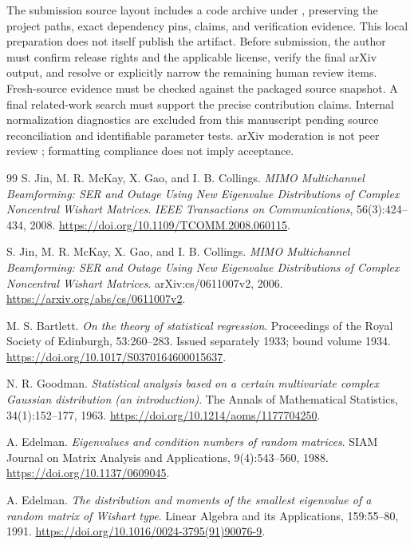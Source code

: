 \documentclass[11pt]{article}
\begin{document}
The submission source layout includes a code archive under
, preserving the project paths,
exact dependency pins, claims, and verification evidence. This local preparation
does not itself publish the artifact. Before submission, the author must
confirm release rights and the applicable license, verify the final arXiv
output, and resolve or explicitly narrow the remaining human review items.
Fresh-source evidence must be checked against the packaged source snapshot. A final related-work search must support
the precise contribution claims. Internal normalization diagnostics are excluded
from this manuscript pending source reconciliation and identifiable parameter
tests. arXiv moderation is not peer review
\cite{arxivpolicy}; formatting compliance does not imply acceptance.

\begin{thebibliography}{99}
\small
{}
S. Jin, M. R. McKay, X. Gao, and I. B. Collings.
\emph{MIMO Multichannel Beamforming: SER and Outage Using New Eigenvalue
Distributions of Complex Noncentral Wishart Matrices}.
\emph{IEEE Transactions on Communications}, 56(3):424--434, 2008.
\url{https://doi.org/10.1109/TCOMM.2008.060115}.

S. Jin, M. R. McKay, X. Gao, and I. B. Collings.
\emph{MIMO Multichannel Beamforming: SER and Outage Using New Eigenvalue
Distributions of Complex Noncentral Wishart Matrices}.
arXiv:cs/0611007v2, 2006.
\url{https://arxiv.org/abs/cs/0611007v2}.

M. S. Bartlett. \emph{On the theory of statistical regression}.
Proceedings of the Royal Society of Edinburgh, 53:260--283.
Issued separately 1933; bound volume 1934.
\url{https://doi.org/10.1017/S0370164600015637}.

N. R. Goodman. \emph{Statistical analysis based on a certain multivariate
complex Gaussian distribution (an introduction)}.
The Annals of Mathematical Statistics, 34(1):152--177, 1963.
\url{https://doi.org/10.1214/aoms/1177704250}.

A. Edelman. \emph{Eigenvalues and condition numbers of random matrices}.
SIAM Journal on Matrix Analysis and Applications, 9(4):543--560, 1988.
\url{https://doi.org/10.1137/0609045}.

A. Edelman. \emph{The distribution and moments of the smallest eigenvalue
of a random matrix of Wishart type}.
Linear Algebra and its Applications, 159:55--80, 1991.
\url{https://doi.org/10.1016/0024-3795(91)90076-9}.


\end{thebibliography}
\end{document}
